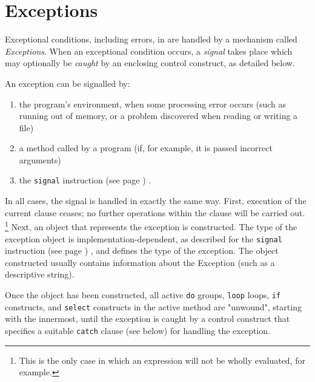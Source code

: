 \chapter{Exceptions}\label{refexcep}
 
Exceptional conditions, including errors, in \nr{} are handled by a
mechanism called \emph{Exceptions}.
When an exceptional condition occurs, a \emph{signal} takes place
which may optionally be \emph{caught} by an enclosing control
construct, as detailed below.
 
An exception can be signalled by:
\begin{enumerate}
\item the program's environment, when some processing error occurs (such
as running out of memory, or a problem discovered when reading or
writing a file)
\item a method called by a \nr{} program (if, for example, it is passed
incorrect arguments)
\item the  \texttt{signal} instruction (see page \pageref{refsignal}) .
\end{enumerate}
In all cases, the signal is handled in exactly the same way.
First, execution of the current clause ceases; no further operations
within the clause will be carried out.
\footnote{
This is the only case in which an expression will not be wholly
evaluated, for example.
}
Next, an object that represents the exception is constructed.  The type
of the exception object is implementation-dependent, as described for
the  \texttt{signal} instruction (see page \pageref{refsignal}) , and defines the
type of the exception.  The object constructed usually contains
information about the Exception (such as a descriptive string).
 
Once the object has been constructed, all active \texttt{do} groups,
\texttt{loop} loops, \texttt{if} constructs, and \texttt{select}
constructs in the active method are "unwound", starting with the
innermost, until the exception is caught by a control construct that
specifies a suitable \texttt{catch} clause (see below) for handling the
exception.
 
